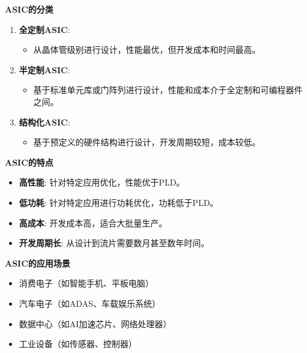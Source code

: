 \documentclass{beamer}
\providecommand{\tightlist}{%
  \setlength{\itemsep}{0pt}\setlength{\parskip}{0pt}}
\begin{document}
\begin{frame}{\textbf{ASIC的分类}}
\begin{enumerate}
\tightlist
\item
    \textbf{全定制ASIC}:

    \begin{itemize}
    \tightlist
    \item
    从晶体管级别进行设计，性能最优，但开发成本和时间最高。\\
    \end{itemize}
\item
    \textbf{半定制ASIC}:

    \begin{itemize}
    \tightlist
    \item
    基于标准单元库或门阵列进行设计，性能和成本介于全定制和可编程器件之间。\\
    \end{itemize}
\item
    \textbf{结构化ASIC}:

    \begin{itemize}
    \tightlist
    \item
    基于预定义的硬件结构进行设计，开发周期较短，成本较低。
    \end{itemize}
\end{enumerate}
\end{frame}

\begin{frame}{\textbf{ASIC的特点}}
\begin{itemize}
\tightlist
\item
    \textbf{高性能}: 针对特定应用优化，性能优于PLD。\\
\item
    \textbf{低功耗}: 针对特定应用进行功耗优化，功耗低于PLD。\\
\item
    \textbf{高成本}: 开发成本高，适合大批量生产。\\
\item
    \textbf{开发周期长}: 从设计到流片需要数月甚至数年时间。
\end{itemize}
\end{frame}

\begin{frame}{\textbf{ASIC的应用场景}}
\begin{itemize}
\tightlist
\item
    消费电子（如智能手机、平板电脑）\\
\item
    汽车电子（如ADAS、车载娱乐系统）\\
\item
    数据中心（如AI加速芯片、网络处理器）\\
\item
    工业设备（如传感器、控制器）
\end{itemize}
\end{frame}
\end{document}
